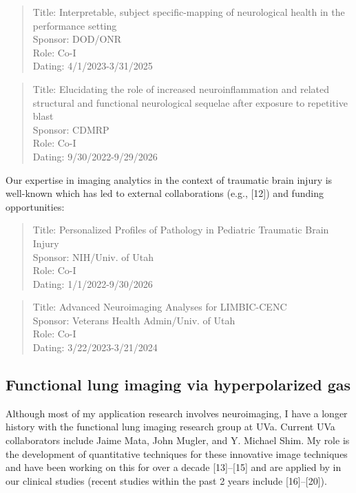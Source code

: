 \documentclass[
  11pt,
]{article}
\begin{document}
\begin{quote}
Title: Interpretable, subject specific-mapping of neurological health in
the performance setting\\
Sponsor: DOD/ONR\\
Role: Co-I\\
Dating: 4/1/2023-3/31/2025
\end{quote}

\begin{quote}
Title: Elucidating the role of increased neuroinflammation and related
structural and functional neurological sequelae after exposure to
repetitive blast\\
Sponsor: CDMRP\\
Role: Co-I\\
Dating: 9/30/2022-9/29/2026
\end{quote}

Our expertise in imaging analytics in the context of traumatic brain
injury is well-known which has led to external collaborations (e.g.,
{[}12{]}) and funding opportunities:

\begin{quote}
Title: Personalized Profiles of Pathology in Pediatric Traumatic Brain
Injury\\
Sponsor: NIH/Univ. of Utah\\
Role: Co-I\\
Dating: 1/1/2022-9/30/2026
\end{quote}

\begin{quote}
Title: Advanced Neuroimaging Analyses for LIMBIC-CENC\\
Sponsor: Veterans Health Admin/Univ. of Utah\\
Role: Co-I\\
Dating: 3/22/2023-3/21/2024
\end{quote}

\hypertarget{functional-lung-imaging-via-hyperpolarized-gas}{%
\subsection{Functional lung imaging via hyperpolarized
gas}\label{functional-lung-imaging-via-hyperpolarized-gas}}

Although most of my application research involves neuroimaging, I have a
longer history with the functional lung imaging research group at UVa.
Current UVa collaborators include Jaime Mata, John Mugler, and Y.
Michael Shim. My role is the development of quantitative techniques for
these innovative image techniques and have been working on this for over
a decade {[}13{]}--{[}15{]} and are applied by in our clinical studies
(recent studies within the past 2 years include {[}16{]}--{[}20{]}).
\end{document}
